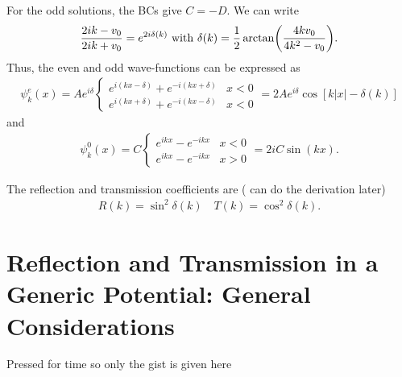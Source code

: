 For the odd solutions, the BCs give $C = -D$.
We can write
\begin{eqnarray}
    \frac{2ik - v_0}{2ik + v_0} = e^{2i\delta(k)} ~{\rm with}~ \delta(k) = \frac{1}{2} \arctan(\frac{4 k v_0}{4 k^2 - v_0})
.\end{eqnarray}
Thus, the even and odd wave-functions can be expressed as
\begin{eqnarray}
    \psi_{k}^{e}(x) = Ae^{i\delta} \begin{cases}
        e^{i(kx - \delta)} + e^{-i(kx + \delta)} & x < 0 \\
        e^{i(kx + \delta)} + e^{-i(kx - \delta)} & x < 0
    \end{cases}
    = 2Ae^{i\delta} \cos[k|x| - \delta(k)]
\end{eqnarray}
and
\begin{eqnarray}
    \psi_{k}^{0}(x) = C \begin{cases}
        e^{ikx} - e^{-ikx} & x < 0 \\
        e^{ikx} - e^{-ikx} & x > 0
    \end{cases}
    = 2i C \sin(kx)
.\end{eqnarray}

The reflection and transmission coefficients are ({\color{red} can do the derivation later})
\begin{eqnarray}
    R(k) = \sin^2{\delta(k)} \quad T(k) = \cos^2{\delta(k)}
.\end{eqnarray}


\section{Reflection and Transmission in a Generic Potential: General Considerations}
{\color{red} Pressed for time so only the gist is given here}

